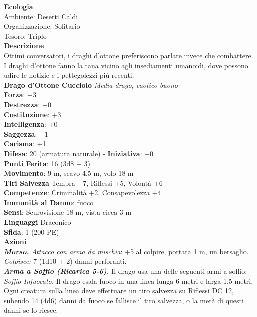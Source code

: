 \begin{multicols}{2}
\textbf{Ecologia}\\
Ambiente: Deserti Caldi\\
Organizzazione: Solitario\\
Tesoro: Triplo\\
\textbf{Descrizione}\\
Ottimi conversatori, i draghi d'ottone preferiscono parlare invece che combattere. I draghi d'ottone fanno la tana vicino agli insediamenti umanoidi, dove possono udire le notizie e i pettegolezzi più recenti.\\


\medskip\textbf{Drago d'Ottone Cucciolo}
\emph{Media drago, caotico buono}\\
\textbf{Forza}: +3\\
\textbf{Destrezza}: +0\\
\textbf{Costituzione}: +3\\
\textbf{Intelligenza}: +0\\
\textbf{Saggezza}: +1\\
\textbf{Carisma}: +1\\
\textbf{Difesa}: 20 (armatura naturale) - \textbf{Iniziativa}: +0\\
\textbf{Punti Ferita}: 16 (3d8 + 3)\\
\textbf{Movimento}: 9 m, scavo 4,5 m, volo 18 m\\
\textbf{Tiri Salvezza} Tempra +7, Riflessi +5, Volontà +6\\
\textbf{Competenze}: Criminalità +2, Consapevolezza +4\\
\textbf{Immunità al Danno}: fuoco\\
\textbf{Sensi}: Scurovisione 18 m, vista cieca 3 m\\
\textbf{Linguaggi} Draconico\\
\textbf{Sfida}: 1 (200 PE)\smallskip\\
\smallskip\textbf{Azioni}\\
\emph{\textbf{Morso.} Attacco con arma da mischia}: +5 al colpire, portata 1 m, un bersaglio.\\
\emph{Colpisce:} 7 (1d10 + 2) danni perforanti.\\
\emph{\textbf{Arma a Soffio (Ricarica 5-6).}} Il drago usa una delle seguenti armi a soffio:\\
\emph{Soffio Infuocato.} Il drago esala fuoco in una linea lunga 6 metri e larga 1,5 metri. Ogni creatura sulla linea deve effettuare un tiro salvezza su Riflessi DC  12, subendo 14 (4d6) danni da fuoco se fallisce il tiro salvezza, o la metà di questi danni se lo riesce.\\

\end{multicols}
